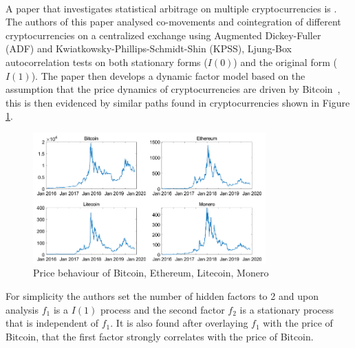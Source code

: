 \\[5mm]
A paper that investigates statistical arbitrage on multiple cryptocurrencies is \cite{Figa-TalamancaGianna2021Cdff}. The authors of this paper analysed co-movements and cointegration of different cryptocurrencies on a centralized exchange using Augmented Dickey-Fuller (ADF) and  Kwiatkowsky-Phillips-Schmidt-Shin (KPSS), Ljung-Box autocorrelation tests on both stationary forms ($I(0)$) and the original form ($I(1)$). The paper then develops a dynamic factor model based on the assumption that the price dynamics of cryptocurrencies are driven by Bitcoin~\cite{blau2020comovement}, this is then evidenced by similar paths found in cryptocurrencies shown in Figure \ref{fig:pricebehaviour}.
\begin{figure}[h!]
    \centering
    \includegraphics[width=0.8\textwidth]{background/Images/price_behaviour.png}
    \caption{Price behaviour of Bitcoin, Ethereum, Litecoin, Monero~\cite{Figa-TalamancaGianna2021Cdff}}
    \label{fig:pricebehaviour}
\end{figure}

\noindent For simplicity the authors set the number of hidden factors to 2 and upon analysis $f_1$ is a $I(1)$ process and the second factor $f_2$ is a stationary process that is independent of $f_1$. It is also found after overlaying $f_1$ with the price of Bitcoin, that the first factor strongly correlates with the price of Bitcoin.

